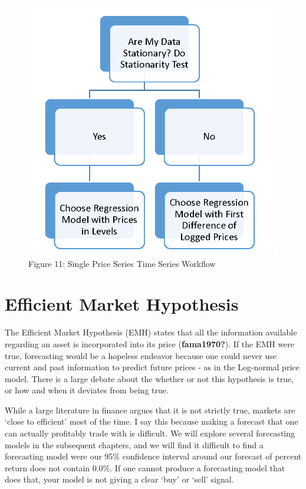 \documentclass[
  letterpaper,
  DIV=11,
  numbers=noendperiod]{scrreprt}
\begin{document}
\begin{figure}

{\centering \includegraphics{images/ts-workflow.png}

}

\caption{Figure 11: Single Price Series Time Series Workflow}

\end{figure}

\hypertarget{efficient-market-hypothesis}{%
\section{Efficient Market
Hypothesis}\label{efficient-market-hypothesis}}

The Efficient Market Hypothesis (EMH) states that all the information
available regarding an asset is incorporated into its price
(\textbf{fama1970?}). If the EMH were true, forecasting would be a
hopeless endeavor because one could never use current and past
information to predict future prices - as in the Log-normal price model.
There is a large debate about the whether or not this hypothesis is
true, or how and when it deviates from being true.

While a large literature in finance argues that it is not strictly true,
markets are `close to efficient' most of the time. I say this because
making a forecast that one can actually profitably trade with is
difficult. We will explore several forecasting models in the subsequent
chapters, and we will find it difficult to find a forecasting model were
our 95\% confidence interval around our forecast of percent return does
not contain 0.0\%. If one cannot produce a forecasting model that does
that, your model is not giving a clear `buy' or `sell' signal.
\end{document}
